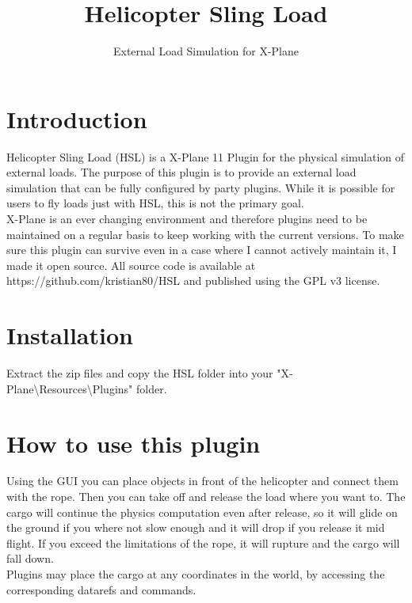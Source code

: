\documentclass[10pt,a4]{scrartcl}
\begin{document}
\title{Helicopter Sling Load}
\subtitle{External Load Simulation for X-Plane}
\date{}
\maketitle


\section{Introduction}

Helicopter Sling Load (HSL) is a X-Plane 11 Plugin for the physical simulation of external loads. The purpose of this plugin is to provide an external load simulation that can be fully configured by  party plugins. While it is possible for users to fly loads just with HSL, this is not the primary goal.\\

X-Plane is an ever changing environment and therefore plugins need to be maintained on a regular basis to keep working with the current versions. To make sure this plugin can survive even in a case where I cannot actively maintain it, I made it open source. All source code is available at https://github.com/kristian80/HSL and published using the GPL v3 license.\\

\section{Installation}

Extract the zip  files and copy the HSL folder into your "X-Plane\textbackslash Resources\textbackslash Plugins" folder.

\section{How to use this plugin}

Using the GUI you can place objects in front of the helicopter and connect them with the rope. Then you can take off and release the load where you want to. The cargo will continue the physics computation even after release, so it will glide on the ground if you where not slow enough and it will drop if you release it mid flight. If you exceed the limitations of the rope, it will rupture and the cargo will fall down.\\

Plugins may place the cargo at any coordinates in the world, by accessing the corresponding datarefs and commands.\\
\end{document}
